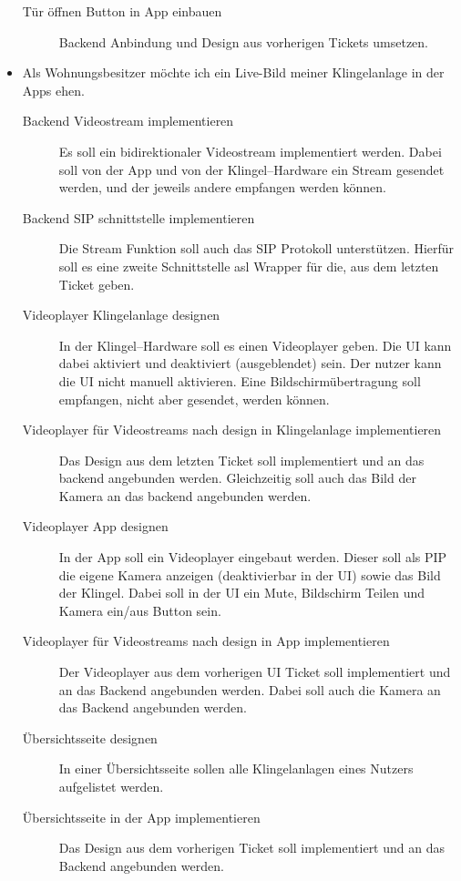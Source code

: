 \begin{itemize}
\begin{description}
            \item[Tür öffnen Button in App einbauen] Backend Anbindung und Design aus vorherigen Tickets umsetzen.
        \end{description}
    \item Als Wohnungsbesitzer möchte ich ein Live-Bild meiner Klingelanlage in der Apps ehen.
        \begin{description}
            \item[Backend Videostream implementieren] Es soll ein bidirektionaler Videostream implementiert werden.
                Dabei soll von der App und von der Klingel--Hardware ein Stream gesendet werden, und der jeweils andere empfangen werden können.
            \item[Backend SIP schnittstelle implementieren] Die Stream Funktion soll auch das SIP Protokoll unterstützen.
                Hierfür soll es eine zweite Schnittstelle asl Wrapper für die, aus dem letzten Ticket geben.
            \item[Videoplayer Klingelanlage designen] In der Klingel--Hardware soll es einen Videoplayer geben.
                Die UI kann dabei aktiviert und deaktiviert (ausgeblendet) sein.
                Der nutzer kann die UI nicht manuell aktivieren.
                Eine Bildschirmübertragung soll empfangen, nicht aber gesendet, werden können.
            \item[Videoplayer für Videostreams nach design in Klingelanlage implementieren] Das Design aus dem letzten Ticket soll implementiert und an das backend angebunden werden.
                Gleichzeitig soll auch das Bild der Kamera an das backend angebunden werden.
            \item[Videoplayer App designen] In der App soll ein Videoplayer eingebaut werden.
                Dieser soll als PIP die eigene Kamera anzeigen (deaktivierbar in der UI) sowie das Bild der Klingel.
                Dabei soll in der UI ein Mute, Bildschirm Teilen und Kamera ein/aus Button sein.
            \item[Videoplayer für Videostreams nach design in App implementieren] Der Videoplayer aus dem vorherigen UI Ticket soll implementiert und an das Backend angebunden werden.
                Dabei soll auch die Kamera an das Backend angebunden werden.
            \item[Übersichtsseite  designen] In einer Übersichtsseite sollen alle Klingelanlagen eines Nutzers aufgelistet werden.
            \item[Übersichtsseite  in der App implementieren] Das Design aus dem vorherigen Ticket soll implementiert und an das Backend angebunden werden.

\end{description}
\end{itemize}
